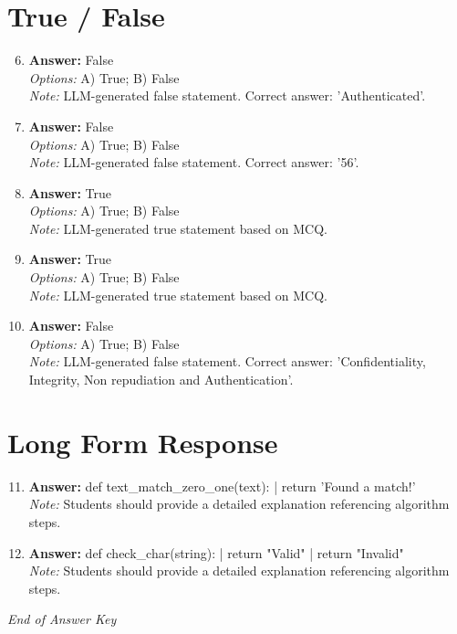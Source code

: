 \documentclass[12pt]{article}
\begin{document}
\section*{True / False}
\begin{enumerate}[label=\arabic*.]
\setcounter{enumi}{5}
\item \textbf{Answer:} False
\\ \textit{Options:} A) True; B) False
\\ \textit{Note:} LLM-generated false statement. Correct answer: 'Authenticated'.
\item \textbf{Answer:} False
\\ \textit{Options:} A) True; B) False
\\ \textit{Note:} LLM-generated false statement. Correct answer: '56'.
\item \textbf{Answer:} True
\\ \textit{Options:} A) True; B) False
\\ \textit{Note:} LLM-generated true statement based on MCQ.
\item \textbf{Answer:} True
\\ \textit{Options:} A) True; B) False
\\ \textit{Note:} LLM-generated true statement based on MCQ.
\item \textbf{Answer:} False
\\ \textit{Options:} A) True; B) False
\\ \textit{Note:} LLM-generated false statement. Correct answer: 'Confidentiality, Integrity, Non repudiation and Authentication'.
\end{enumerate}

\section*{Long Form Response}
\begin{enumerate}[label=\arabic*.]
\setcounter{enumi}{10}
\item \textbf{Answer:} def text\_match\_zero\_one(text): | return 'Found a match!'
\\ \textit{Note:} Students should provide a detailed explanation referencing algorithm steps.
\item \textbf{Answer:} def check\_char(string): | return "Valid" | return "Invalid"
\\ \textit{Note:} Students should provide a detailed explanation referencing algorithm steps.
\end{enumerate}

\vfill
\noindent\textit{End of Answer Key}
\end{document}
